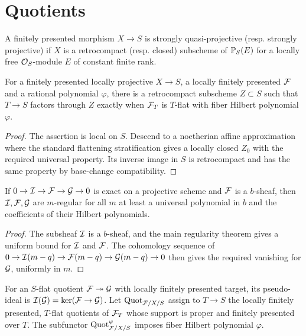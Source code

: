 \section{Quotients}

\begin{definition}
\label{akcp-2-1-strong-qproj}
A finitely presented morphism $X\to S$ is strongly quasi-projective (resp.
strongly projective) if $X$ is a retrocompact (resp. closed) subscheme of
$\mathbb P_S(E)$ for a locally free $\mathcal O_S$-module $E$ of constant finite rank.
\end{definition}

\begin{lemma}
\label{akcp-2-3-flattening}
For a finitely presented locally projective $X\to S$, a locally finitely
presented $\mathcal F$ and a rational polynomial $\varphi$, there is a retrocompact
subscheme $Z\subset S$ such that $T\to S$ factors through $Z$ exactly when
$\mathcal F_T$ is $T$-flat with fiber Hilbert polynomial $\varphi$.
\end{lemma}
\begin{proof}
The assertion is local on $S$.  Descend to a noetherian affine approximation
where the standard flattening stratification gives a locally closed $Z_0$ with
the required universal property.  Its inverse image in $S$ is retrocompact and
has the same property by base-change compatibility.
\end{proof}

\begin{lemma}
\label{akcp-2-4-regularity}
If $0\to\mathcal I\to\mathcal F\to\mathcal G\to0$ is exact on a projective scheme and $\mathcal F$ is a
$b$-sheaf, then $\mathcal I,\mathcal F,\mathcal G$ are $m$-regular for all $m$ at least a universal
polynomial in $b$ and the coefficients of their Hilbert polynomials.
\end{lemma}
\begin{proof}
The subsheaf $\mathcal I$ is a $b$-sheaf, and the main regularity theorem gives a
uniform bound for $\mathcal I$ and $\mathcal F$.  The cohomology sequence of
$0\to\mathcal I(m-q)\to\mathcal F(m-q)\to\mathcal G(m-q)\to0$ then gives the required vanishing
for $\mathcal G$, uniformly in $m$.
\end{proof}

\begin{definition}
\label{akcp-2-5-quot-functor}
For an $S$-flat quotient $\mathcal F\twoheadrightarrow\mathcal G$ with locally finitely
presented target, its pseudo-ideal is $\mathcal I(\mathcal G)=\ker(\mathcal F\to\mathcal G)$.  Let
$\operatorname{Quot}_{\mathcal F/X/S}$ assign to $T\to S$ the locally finitely presented,
$T$-flat quotients of $\mathcal F_T$ whose support is proper and finitely presented
over $T$.  The subfunctor $\operatorname{Quot}^{\varphi}_{\mathcal F/X/S}$ imposes fiber Hilbert
polynomial $\varphi$.
\end{definition}

